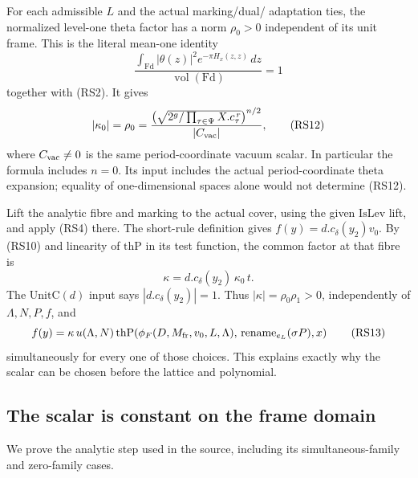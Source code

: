 For each admissible \(L\) and the actual marking/dual/
adaptation ties, the normalized level-one theta factor
has a norm \(\rho_0>0\) independent of its unit frame.
This is the literal mean-one identity
\[
 \frac{\int_{\mathrm{Fd}}|\theta(z)|^2
                      e^{-\pi H_x(z,z)}\,dz}
              {\operatorname{vol}(\mathrm{Fd})}=1
\]
together with (RS2).
It gives
\[
 |\kappa_0|=\rho_0=
 \frac{\left(\sqrt{2^g/\prod_{\tau\in\Psi}X.c_\tau^{\,r}}\right)^{n/2}}
      {|C_{\rm vac}|},
 \tag{RS12}\label{eq:sr-source-mean-one-reading-factor}
\]
where \(C_{\rm vac}\ne0\) is the same period-coordinate
vacuum scalar.  In particular the formula includes
\(n=0\).  Its input includes the actual period-coordinate
theta expansion; equality of one-dimensional spaces
alone would not determine (RS12).

Lift the analytic fibre and marking to the actual
cover, using the given \(\mathrm{IsLev}\) lift, and
apply (RS4) there.
The short-rule definition gives
\(f(y)=d.c_\delta(y_2)v_0\).
By (RS10) and linearity of \(\mathrm{thP}\) in its
test function, the common factor at that fibre is
\[
 \kappa=d.c_\delta(y_2)\,\kappa_0\,t .
\]
The \(\mathrm{UnitC}(d)\) input says
\(|d.c_\delta(y_2)|=1\).
Thus \(|\kappa|=\rho_0\rho_1>0\), independently of
\(\Lambda,N,P,f\), and
\[
 f(y)=\kappa\,u(\Lambda,N)\,
   \mathrm{thP}\!\left(
      \phi_F(D,M_{\rm fr},v_0,L,\Lambda),\,
             \mathrm{rename}_{e_L}(\sigma P),x\right)
 \tag{RS13}\label{eq:sr-source-common-fibre-short-reading}
\]
simultaneously for every one of those choices.
This explains exactly why the scalar can be chosen
before the lattice and polynomial.

\subsection{The scalar is constant on the frame domain}
We prove the analytic step used in the source, including
its simultaneous-family and zero-family cases.

